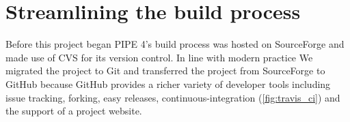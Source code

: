 \section{Streamlining the build process}
Before this project began PIPE 4's build process was hosted on SourceForge and made use of CVS for its version control. In line with modern practice We migrated the project to Git and transferred the project from SourceForge to GitHub because GitHub provides a richer variety of developer tools including issue tracking, forking, easy releases, continuous-integration (\cref{fig:travis_ci}) and the support of a project website.




